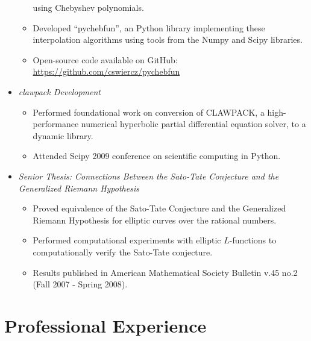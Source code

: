 \documentclass{article}
\begin{document}
\begin{itemize}
\begin{itemize}
      using Chebyshev polynomials.
    \item Developed ``pychebfun'', an Python library implementing these
      interpolation algorithms using tools from the Numpy and Scipy libraries.
    \item Open-source code available on GitHub:
      \url{https://github.com/cswiercz/pychebfun}
    \end{itemize}
  \item {\it {\sc clawpack} Development}
    \begin{itemize}
    \item Performed foundational work on conversion of CLAWPACK, a
      high-performance numerical hyperbolic partial differential equation
      solver, to a dynamic library.
    \item Attended Scipy 2009 conference on scientific computing in Python.
    \end{itemize}
  \item {\it Senior Thesis: Connections Between the Sato-Tate Conjecture
    and the Generalized Riemann Hypothesis}
    \begin{itemize}
    \item Proved equivalence of the Sato-Tate Conjecture and the Generalized
      Riemann Hypothesis for elliptic curves over the rational numbers.
    \item Performed computational experiments with elliptic $L$-functions to
      computationally verify the Sato-Tate conjecture.
    \item Results published in American Mathematical Society Bulletin v.45 no.2
      (Fall 2007 - Spring 2008).
    \end{itemize}

\end{itemize}



\section*{Professional Experience}
\end{document}
